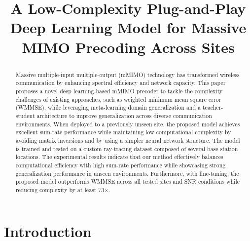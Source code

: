 \documentclass[conference]{IEEEtran}
\begin{document}
\title{A Low-Complexity Plug-and-Play Deep Learning Model for Massive MIMO Precoding Across Sites\\
\author{
}
}

\maketitle
\IEEEpubidadjcol

\begin{abstract}
Massive multiple-input multiple-output (mMIMO) technology has transformed wireless communication by enhancing spectral efficiency and network capacity. This paper proposes a novel deep learning-based mMIMO precoder to tackle the complexity challenges of existing approaches, such as weighted minimum mean square error (WMMSE), while leveraging meta-learning domain generalization and a teacher-student architecture to improve generalization across diverse communication environments. 
When deployed to a previously unseen site, the proposed model
achieves excellent sum-rate performance while maintaining low computational complexity by avoiding matrix inversions and by using a simpler neural network structure.
The model is trained and tested on a custom ray-tracing dataset composed of several base station locations. The experimental results indicate that our method effectively balances computational efficiency with high sum-rate performance while showcasing strong generalization performance in unseen environments.
Furthermore, with fine-tuning, the proposed model outperforms WMMSE across all tested sites and SNR conditions while reducing complexity by at least 73$\times$.
\end{abstract}


\section{Introduction} \label{Sec:Intro}

\end{document}

